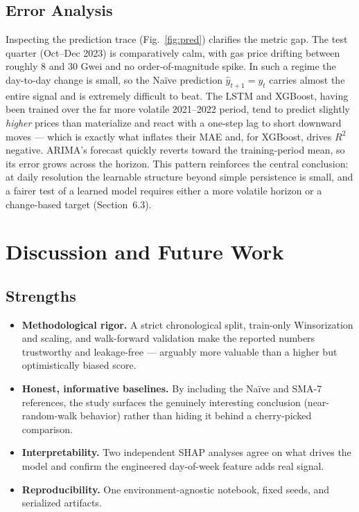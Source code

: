\documentclass[11pt,a4paper]{article}
\begin{document}
\subsection{Error Analysis}
Inspecting the prediction trace (Fig.~\ref{fig:pred}) clarifies the metric gap. The test quarter
(Oct--Dec 2023) is comparatively calm, with gas price drifting between roughly 8 and 30 Gwei and
no order-of-magnitude spike. In such a regime the day-to-day change is small, so the Na\"ive
prediction $\hat{y}_{t+1}=y_t$ carries almost the entire signal and is extremely difficult to
beat. The LSTM and XGBoost, having been trained over the far more volatile 2021--2022 period,
tend to predict slightly \emph{higher} prices than materialize and react with a one-step lag to
short downward moves --- which is exactly what inflates their MAE and, for XGBoost, drives $R^2$
negative. ARIMA's forecast quickly reverts toward the training-period mean, so its error grows
across the horizon. This pattern reinforces the central conclusion: at daily resolution the
learnable structure beyond simple persistence is small, and a fairer test of a learned model
requires either a more volatile horizon or a change-based target (Section~6.3).

\section{Discussion and Future Work}

\subsection{Strengths}
\begin{itemize}[leftmargin=1.4em]
\item \textbf{Methodological rigor.} A strict chronological split, train-only Winsorization and
scaling, and walk-forward validation make the reported numbers trustworthy and leakage-free ---
arguably more valuable than a higher but optimistically biased score.
\item \textbf{Honest, informative baselines.} By including the Na\"ive and SMA-7 references, the
study surfaces the genuinely interesting conclusion (near-random-walk behavior) rather than
hiding it behind a cherry-picked comparison.
\item \textbf{Interpretability.} Two independent SHAP analyses agree on what drives the model and
confirm the engineered day-of-week feature adds real signal.
\item \textbf{Reproducibility.} One environment-agnostic notebook, fixed seeds, and serialized
artifacts.
\end{itemize}
\end{document}

